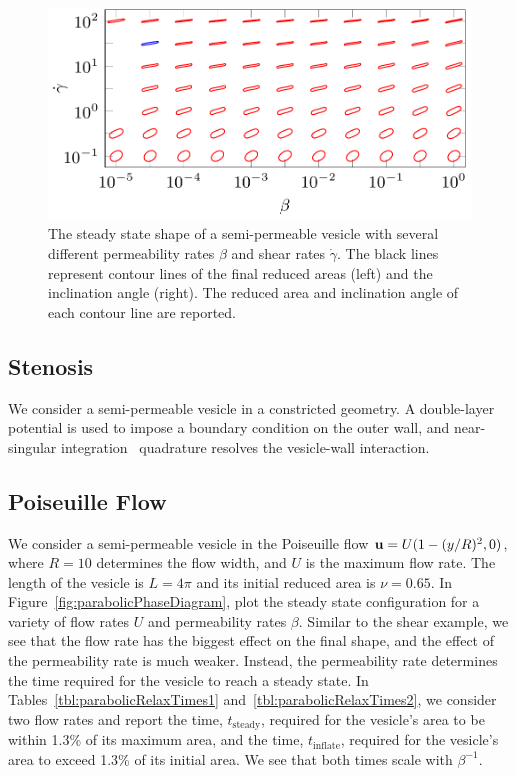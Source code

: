 \documentclass[9pt,twocolumn,twoside,lineno]{pnas-new}
\newif\ifTikz
\begin{document}
\begin{figure}[htp]
  \centering
  \includegraphics[width=\linewidth]{figures/shearPhaseDiagramRA2.pdf}
  \caption{\label{fig:shearPhaseDiagram} The steady state shape of a
  semi-permeable vesicle with several different permeability rates
  $\beta$ and shear rates $\dot{\gamma}$. The black lines represent
  contour lines of the final reduced areas (left) and the inclination
  angle (right). The reduced area and inclination angle of each contour
  line are reported.}
\end{figure}

\subsection*{Stenosis}
We consider a semi-permeable vesicle in a constricted geometry. A
double-layer potential is used to impose a boundary condition on the
outer wall, and near-singular integration~\cite{qua-bir2014} quadrature
resolves the vesicle-wall interaction.

\subsection*{Poiseuille Flow}
We consider a semi-permeable vesicle in the Poiseuille flow $\mathbf{u} =
U(1-(y/R)^2,0)$, where $R=10$ determines the flow width, and $U$ is the
maximum flow rate. The length of the vesicle is $L = 4\pi$ and its
initial reduced area is $\nu = 0.65$. In
Figure~\ref{fig:parabolicPhaseDiagram}, plot the steady state
configuration for a variety of flow rates $U$ and permeability rates
$\beta$. Similar to the shear example, we see that the flow rate has the
biggest effect on the final shape, and the effect of the permeability
rate is much weaker. Instead, the permeability rate determines the time
required for the vesicle to reach a steady state. In
Tables~\ref{tbl:parabolicRelaxTimes1}
and~\ref{tbl:parabolicRelaxTimes2}, we consider two flow rates and
report the time, $t_\mathrm{steady}$, required for the vesicle's area to
be within 1.3\% of its maximum area, and the time, $t_\mathrm{inflate}$,
required for the vesicle's area to exceed 1.3\% of its initial area. We
see that both times scale with $\beta^{-1}$. 
\end{document}
